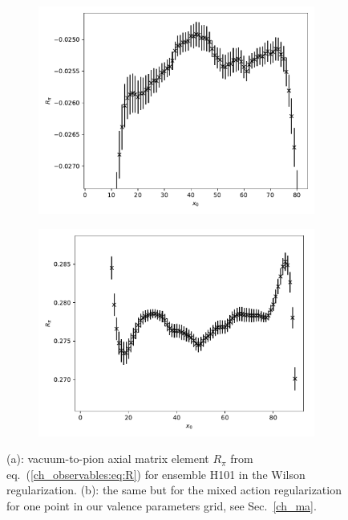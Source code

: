\begin{figure}
    \centering
    \begin{subfigure}{1.\textwidth}
    	\includegraphics[width=\textwidth]{./cap3/figs/R_H101.pdf}
    	\caption{}
    \end{subfigure}
    \begin{subfigure}{1.\textwidth}
    	\includegraphics[width=\textwidth]{./cap3/figs/R_tm_H101.pdf}
    	\caption{}
    \end{subfigure}
    \caption{(a): vacuum-to-pion axial matrix element $R_{\pi}$ from eq.~(\ref{ch_observables:eq:R}) for ensemble H101 in the Wilson regularization. (b): the same but for the mixed action regularization for one point in our valence parameters grid, see Sec.~\ref{ch_ma}.}
        \label{ch_observables:fig:R}
\end{figure}

